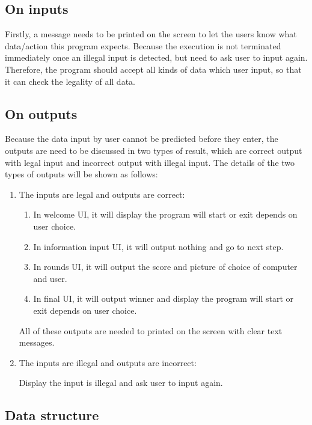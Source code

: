 \documentclass[12pt]{article}
\begin{document}
	\subsection{On inputs}
	Firstly, a message needs to be printed on the screen to let the users know what data/action this program expects. Because the execution is not terminated immediately once an illegal input is detected, but need to ask user to input again. Therefore, the program should accept all kinds of data which user input, so that it can check the legality of all data.
	
	\subsection{On outputs}
	Because the data input by user cannot be predicted before they enter, the outputs are need to be discussed in two types of result, which are correct output with legal input and incorrect output with illegal input. The details of the two types of outputs will be shown as follows:
	
	\begin{enumerate}
		\item The inputs are legal and outputs are correct:
	
		\begin{enumerate}[1)]
			\item In welcome UI, it will display the program will start or exit depends on user choice.
			\item In information input UI, it will output nothing and go to next step.
			\item In rounds UI, it will output the score and picture of choice of computer and user.
			\item In final UI, it will output winner and display the program will start or exit depends on user choice.
		\end{enumerate}
		
		All of these outputs are needed to printed on the screen with clear text messages.
	
		\item The inputs are illegal and outputs are incorrect:
		
		Display the input is illegal and ask user to input again.
	\end{enumerate}

	\subsection{Data structure}
	
\end{document}
